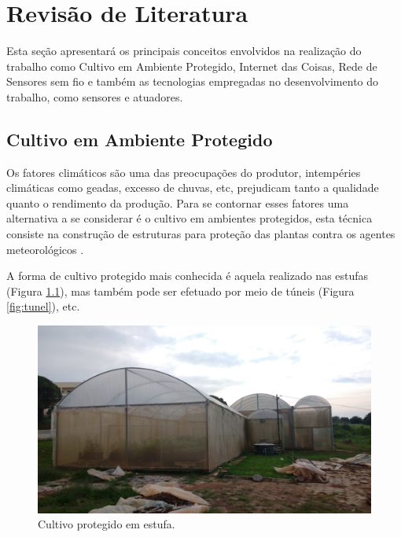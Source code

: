 \chapter{Revisão de Literatura}
Esta seção apresentará os principais conceitos envolvidos na realização do trabalho como Cultivo em Ambiente Protegido, Internet das Coisas, Rede de Sensores sem fio e também as tecnologias empregadas no desenvolvimento do trabalho, como sensores e atuadores.


\section{Cultivo em Ambiente Protegido}
Os fatores climáticos são uma das preocupações do produtor, intempéries climáticas como geadas, excesso de chuvas, etc, prejudicam tanto a qualidade quanto o rendimento da produção. Para se contornar esses fatores uma alternativa a se considerar é o cultivo em ambientes protegidos, esta técnica consiste na construção de estruturas para proteção das plantas contra os agentes meteorológicos  \cite{silva2014cultivoprotegido}.

A forma de cultivo protegido mais conhecida é aquela realizado nas estufas (Figura \ref{fig:estufa}), mas também pode ser efetuado por meio de túneis (Figura \ref{fig:tunel}), etc.

\begin{figure}[H]
    \centering
    \includegraphics[scale=0.1]{04-figuras/estufa.jpg}
    \caption{Cultivo protegido em estufa.}
    \vspace{-\baselineskip}
    \label{fig:estufa}
\end{figure}


